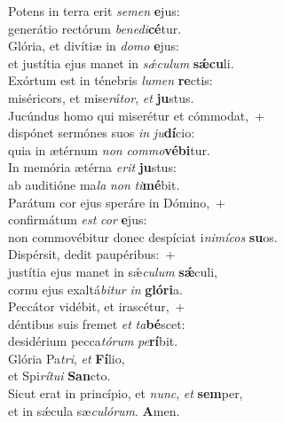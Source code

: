 \evenverse Potens in terra erit \textit{se}\textit{men} \textbf{e}jus:~\*\\
\evenverse generátio rectórum \textit{be}\textit{ne}\textit{di}\textbf{cé}tur.\\
\oddverse Glória, et divítiæ in \textit{do}\textit{mo} \textbf{e}jus:~\*\\
\oddverse et justítia ejus manet in \textit{sǽ}\textit{cu}\textit{lum} \textbf{sǽ}\textbf{cu}li.\\
\evenverse Exórtum est in ténebris \textit{lu}\textit{men} \textbf{re}ctis:~\*\\
\evenverse miséricors, et mise\textit{rá}\textit{tor}, \textit{et} \textbf{ju}stus.\\
\oddverse Jucúndus homo qui miserétur et cómmodat,~+\\
\oddverse  dispónet sermónes suos \textit{in} \textit{ju}\textbf{dí}cio:~\*\\
\oddverse quia in ætérnum \textit{non} \textit{com}\textit{mo}\textbf{vé}\textbf{bi}tur.\\
\evenverse In memória ætérna \textit{e}\textit{rit} \textbf{ju}stus:~\*\\
\evenverse ab auditióne ma\textit{la} \textit{non} \textit{ti}\textbf{mé}bit.\\
\oddverse Parátum cor ejus speráre in Dómino,~+\\
\oddverse  confirmátum \textit{est} \textit{cor} \textbf{e}jus:~\*\\
\oddverse non commovébitur donec despíciat i\textit{ni}\textit{mí}\textit{cos} \textbf{su}os.\\
\evenverse Dispérsit, dedit paupéribus:~+\\
\evenverse  justítia ejus manet in sǽ\textit{cu}\textit{lum} \textbf{sǽ}culi,~\*\\
\evenverse cornu ejus exaltá\textit{bi}\textit{tur} \textit{in} \textbf{gló}\textbf{ri}a.\\
\oddverse Peccátor vidébit, et irascétur,~+\\
\oddverse  déntibus suis fremet \textit{et} \textit{ta}\textbf{bé}scet:~\*\\
\oddverse desidérium pecca\textit{tó}\textit{rum} \textit{pe}\textbf{rí}bit.\\
\evenverse Glória Pa\textit{tri}, \textit{et} \textbf{Fí}lio,~\*\\
\evenverse et Spi\textit{rí}\textit{tu}\textit{i} \textbf{San}cto.\\
\oddverse Sicut erat in princípio, et \textit{nunc}, \textit{et} \textbf{sem}per,~\*\\
\oddverse et in sǽcula sæ\textit{cu}\textit{ló}\textit{rum}. \textbf{A}men.\\
